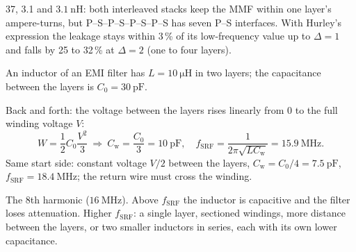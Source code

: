 
\begin{solutionblock}
	37, 3.1 and $\SI{3.1}{\nano\henry}$: both interleaved stacks keep the MMF within one layer's ampere-turns, but P--S--P--S--P--S--P--S has seven P--S interfaces. With Hurley's expression the leakage stays within 3\,\% of its low-frequency value up to $\Delta=1$ and falls by 25 to 32\,\% at $\Delta=2$ (one to four layers).
\end{solutionblock}



An inductor of an EMI filter has $L=\SI{10}{\micro\henry}$ in two layers; the capacitance between the layers is $C_0=\SI{30}{\pico\farad}$.


\begin{solutionblock}
	Back and forth: the voltage between the layers rises linearly from 0 to the full winding voltage $V$:
	\begin{equation}
		W=\frac{1}{2}C_0\frac{V^2}{3}\ \Rightarrow\ C_\mathrm{w}=\frac{C_0}{3}=\SI{10}{\pico\farad},\quad f_\mathrm{SRF}=\frac{1}{2\pi\sqrt{LC_\mathrm{w}}}=\SI{15.9}{\mega\hertz}.
	\end{equation}
	Same start side: constant voltage $V/2$ between the layers, $C_\mathrm{w}=C_0/4=\SI{7.5}{\pico\farad}$, $f_\mathrm{SRF}=\SI{18.4}{\mega\hertz}$; the return wire must cross the winding.
\end{solutionblock}


\begin{solutionblock}
	The 8th harmonic ($\SI{16}{\mega\hertz}$). Above $f_\mathrm{SRF}$ the inductor is capacitive and the filter loses attenuation. Higher $f_\mathrm{SRF}$: a single layer, sectioned windings, more distance between the layers, or two smaller inductors in series, each with its own lower capacitance.
\end{solutionblock}

